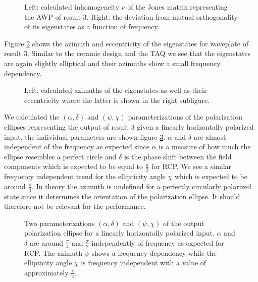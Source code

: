 \begin{figure}[H]
    \centering
    
    \caption{Left: calculated inhomogeneity $\nu$ of the Jones matrix representing the AWP of result 3. Right: the deviation from mutual orthogonality of its eigenstates as a function of frequency.}
    \label{fig:inhomogeneity_orthogonality}
\end{figure}

Figure \ref{fig:polymer_eigenstate_params} shows the azimuth and eccentricity of the eigenstates for waveplate of result 3. Similar to the ceramic design and the TAQ we see that the eigenstates are again slightly elliptical and their azimuths show a small frequency dependency.

\begin{figure}[H]
    \centering
    
    \caption{Left: calculated azimuths of the eigenstates as well as their eccentricity where the latter is shown in the right subfigure.}
    \label{fig:polymer_eigenstate_params}
\end{figure}

We calculated the $(\alpha, \delta)$ and $(\psi, \chi)$ parameterizations of the polarization ellipses representing the output of result 3 given a linearly horizontally polarized input, the individual parameters are shown figure \ref{fig:polymer_params_dotted}. $\alpha$ and $\delta$ are almost independent of the frequency as expected since $\alpha$ is a measure of how much the ellipse resembles a perfect circle and $\delta$ is the phase shift between the field components which is expected to be equal to $\frac{\pi}{2}$ for RCP. We see a similar frequency independent trend for the ellipticity angle $\chi$ which is expected to be around $\frac{\pi}{4}$. In theory the azimuth is undefined for a perfectly circularly polarized state since it determines the orientation of the polarization ellipse. It should therefore not be relevant for the performance.

\begin{figure}[H]
    \centering
    
    \caption{Two parameterizations $(\alpha, \delta)$ and $(\psi, \chi)$ of the output polarization ellipse for a linearly horizontally polarized input. $\alpha$ and $\delta$ are around $\frac{\pi}{4}$ and $\frac{\pi}{2}$ independently of frequency as expected for RCP. The azimuth $\psi$ shows a frequency dependency while the ellipticity angle $\chi$ is frequency independent with a value of approximately $\frac{\pi}{4}$.}
    \label{fig:polymer_params_dotted}
\end{figure}

